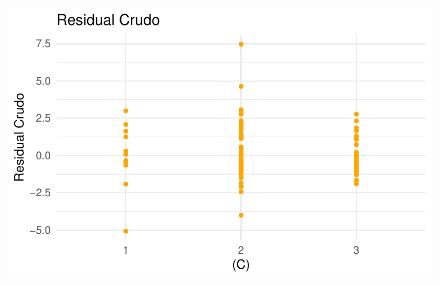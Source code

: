 \documentclass[
  letterpaper,
  DIV=11,
  numbers=noendperiod]{scrartcl}
\begin{document}
\begin{figure}
%
\begin{minipage}{0.50\linewidth}
\includegraphics{Modelos_files/figure-pdf/unnamed-chunk-26-4.pdf}\end{minipage}%

\end{figure}%
\end{document}
